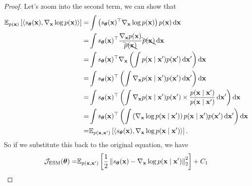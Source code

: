 \begin{proof}
	Let's zoom into the second term, we can show that
	\begin{equation*}
		\begin{aligned}
			\bbE_{p(\bfx)}\left[\left\langle s_{\bftheta}(\bfx),\nabla_{\bfx}\log p(\bfx)\right\rangle\right]= & \int\left(s_{\bftheta}(\bfx)^{\top}\nabla_{\bfx}\log p(\bfx)\right)p(\bfx)\dif\bfx                                                                    \\
			=                                                                                                  & \int s_{\bftheta}(\bfx)^{\top}\frac{\nabla_{\bfx}p(\bfx)}{\bcancel{p(\bfx)}}\bcancel{p(\bfx)}\dif\bfx                                                 \\
			=                                                                                                  & \int s_{\bftheta}(\bfx)^{\top}\nabla_{\bfx}\left(\int p(\bfx\mid\bfx')p(\bfx')\dif\bfx'\right)\dif\bfx                                                \\
			=                                                                                                  & \int s_{\bftheta}(\bfx)^{\top}\left(\int \nabla_{\bfx}p(\bfx\mid\bfx')p(\bfx')\dif\bfx'\right)\dif\bfx                                                \\
			=                                                                                                  & \int s_{\bftheta}(\bfx)^{\top}\left(\int \nabla_{\bfx}p(\bfx\mid\bfx')p(\bfx')\times\frac{p(\bfx\mid\bfx')}{p(\bfx\mid\bfx')}\dif\bfx'\right)\dif\bfx \\
			=                                                                                                  & \int s_{\bftheta}(\bfx)^{\top}\left(\int \left(\nabla_{\bfx}\log p(\bfx\mid\bfx')\right)p(\bfx\mid\bfx')p(\bfx')\dif\bfx'\right)\dif\bfx              \\
			=                                                                                                  & \bbE_{p(\bfx,\bfx')}\left[\left\langle s_{\bftheta}(\bfx),\nabla_{\bfx}\log p(\bfx\mid\bfx')\right\rangle\right].
		\end{aligned}
	\end{equation*}
	So if we substitute this back to the original equation, we have
	\begin{equation*}
		\begin{aligned}
			\mcJ_{\text{ESM}}(\bftheta)= & \bbE_{p(\bfx,\bfx')}\left[\frac{1}{2}\left\|s_{\bftheta}(\bfx)-\nabla_{\bfx}\log p(\bfx\mid\bfx')\right\|_{2}^{2}\right]+C_{1}                                                                \\

\end{aligned}
\end{equation*}
\end{proof}
